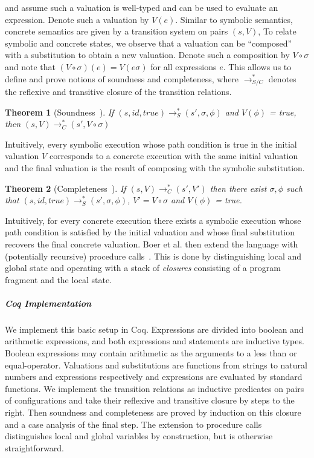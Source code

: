 \documentclass[submission,copyright,creativecommons]{eptcs}
\newtheorem{theorem}{Theorem}
\begin{document}
and assume such a valuation is well-typed and can be used to evaluate an expression. Denote such a valuation by $V(e)$.
Similar to symbolic semantics, concrete semantics are given by a transition system on pairs $(s, V)$,
To relate symbolic and concrete states, we observe that a valuation can be ``composed'' with a substitution
to obtain a new valuation. Denote such a composition by $V \circ \sigma$ and note that $(V \circ \sigma)(e) = V(e\sigma)$
for all expressions $e$.
This allows us to define and prove notions of soundness and completeness, where
$\rightarrow_{S/C}^{*}$ denotes the reflexive and transitive closure of the transition relations.
\begin{theorem}[Soundness~{\cite[Thm. 2.3]{boer2021}}]
  If $(s, id, true) \rightarrow_{S}^{*} (s', \sigma, \phi)$ and $V(\phi)$ = true,
  then $(s, V) \rightarrow_{C}^{*} (s', V \circ \sigma)$
\end{theorem}
Intuitively, every symbolic execution whose path condition is true in the initial valuation $V$
corresponds to a concrete execution with the same initial valuation and the final valuation is
the result of composing with the symbolic substitution.
\begin{theorem}[Completeness~{\cite[Thm. 2.4]{boer2021}}]
  If $(s, V) \rightarrow_{C}^{*} (s', V')$ then there exist $\sigma, \phi$ such that
  $(s, id, true) \rightarrow_{S}^{*} (s', \sigma, \phi)$, $V' = V \circ \sigma$ and $V(\phi)$ = true.
\end{theorem}
Intuitively, for every concrete execution there exists a symbolic execution whose path condition
is satisfied by the initial valuation and whose final substitution recovers the final concrete valuation.
Boer et al. then extend the language with (potentially recursive) procedure calls~\cite[sec. 3]{boer2021}.
This is done by distinguishing local and global state and operating with a stack of \emph{closures} consisting
of a program fragment and the local state.
\subparagraph{Coq Implementation}
We implement this basic setup in Coq. Expressions are divided into boolean and arithmetic expressions,
and both expressions and statements are inductive types. Boolean expressions may contain arithmetic as the
arguments to a less than or equal-operator.
Valuations and substitutions are functions from strings to natural numbers and expressions respectively and
expressions are evaluated by standard functions.
We implement the transition relations as inductive predicates on pairs of configurations and take their
reflexive and transitive closure by steps to the right.
Then soundness and completeness are proved by induction on this closure and a case analysis of the final step.
The extension to procedure calls distinguishes local and global variables by construction, but is
otherwise straightforward.
\end{document}
